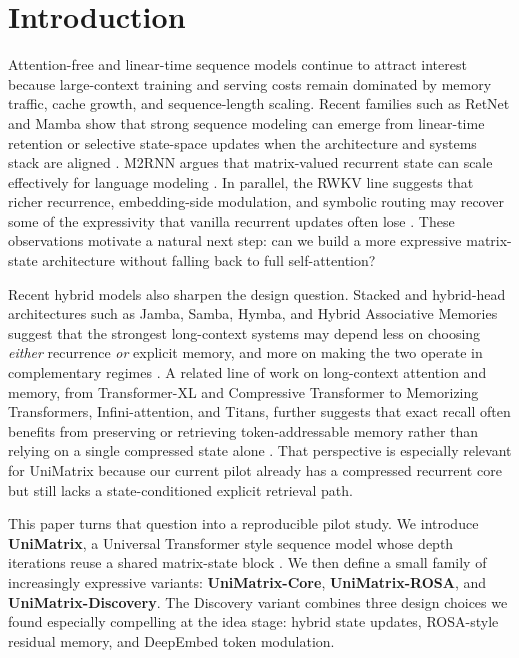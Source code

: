 \documentclass[11pt]{article}
\begin{document}
\section{Introduction}
Attention-free and linear-time sequence models continue to attract interest
because large-context training and serving costs remain dominated by memory
traffic, cache growth, and sequence-length scaling. Recent families such as
RetNet and Mamba show that strong sequence modeling can emerge from linear-time
retention or selective state-space updates when the architecture and systems
stack are aligned \citep{retnet2023,mamba2023}. M2RNN argues that matrix-valued
recurrent state can scale effectively for language modeling \citep{m2rnn2026}.
In parallel, the RWKV line suggests that richer recurrence,
embedding-side modulation, and symbolic routing may recover some of the
expressivity that vanilla recurrent updates often lose \citep{eaglefinch2024,
rwkvwiki2025}. These observations motivate a natural next step: can we build a
more expressive matrix-state architecture without falling back to full
self-attention?

Recent hybrid models also sharpen the design question. Stacked and hybrid-head
architectures such as Jamba, Samba, Hymba, and Hybrid Associative Memories
suggest that the strongest long-context systems may depend less on choosing
\emph{either} recurrence \emph{or} explicit memory, and more on making the two
operate in complementary regimes \citep{jamba2024, samba2024, hymba2024,
ham2026}. A related line of work on long-context attention and memory, from
Transformer-XL and Compressive Transformer to Memorizing Transformers,
Infini-attention, and Titans, further suggests that exact recall often benefits
from preserving or retrieving token-addressable memory rather than relying on a
single compressed state alone \citep{transformerxl2019,compressive2019,
memorizing2022,infiniattention2024,titans2025}. That perspective is especially
relevant for UniMatrix because our current pilot already has a compressed
recurrent core but still lacks a state-conditioned explicit retrieval path.

This paper turns that question into a reproducible pilot study. We introduce
\textbf{UniMatrix}, a Universal Transformer style sequence model whose depth
iterations reuse a shared matrix-state block \citep{dehghani2019universal}. We
then define a small family of increasingly expressive variants:
\textbf{UniMatrix-Core}, \textbf{UniMatrix-ROSA}, and
\textbf{UniMatrix-Discovery}. The Discovery variant combines three design
choices we found especially compelling at the idea stage: hybrid state updates,
ROSA-style residual memory, and DeepEmbed token modulation.
\end{document}
